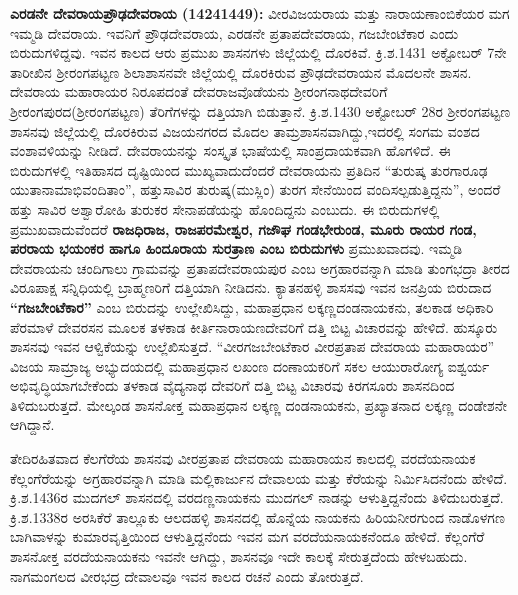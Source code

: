 \textbf{ಎರಡನೇ ದೇವರಾಯ\general{\enginline{-}}ಪ್ರೌಢದೇವರಾಯ (1424\general{\enginline{-}}1449): } ವೀರವಿಜಯರಾಯ ಮತ್ತು ನಾರಾಯಣಾಂಬಿಕೆ\-ಯರ ಮಗ ಇಮ್ಮಡಿ ದೇವರಾಯ. ಇವನಿಗೆ ಪ್ರೌಢದೇವರಾಯ, ಎರಡನೇ ಪ್ರತಾಪದೇವರಾಯ, ಗಜಬೇಂಟೆಕಾರ ಎಂದು ಬಿರುದುಗಳಿದ್ದವು. ಇವನ ಕಾಲದ ಆರು ಪ್ರಮುಖ ಶಾಸನಗಳು ಜಿಲ್ಲೆಯಲ್ಲಿ ದೊರಕಿವೆ. ಕ್ರಿ.ಶ.1431 ಅಕ್ಟೋಬರ್​ 7ನೇ ತಾರೀಖಿನ ಶ‍್ರೀರಂಗಪಟ್ಟಣ ಶಿಲಾಶಾಸನವೇ ಜಿಲ್ಲೆಯಲ್ಲಿ ದೊರಕಿರುವ ಪ್ರೌಢದೇವರಾಯನ ಮೊದಲನೇ ಶಾಸನ. ದೇವರಾಯ ಮಹಾರಾಯರ ನಿರೂಪದಂತೆ ದೇವರಾಜವೊಡೆಯನು ಶ‍್ರೀರಂಗನಾಥದೇವರಿಗೆ ಶ‍್ರೀರಂಗಪುರದ(ಶ‍್ರೀರಂಗಪಟ್ಟಣ) ತೆರಿಗೆಗಳನ್ನು ದತ್ತಿಯಾಗಿ ಬಿಡುತ್ತಾನೆ. ಕ್ರಿ.ಶ.1430 ಅಕ್ಟೋಬರ್​ 28ರ ಶ‍್ರೀರಂಗಪಟ್ಟಣ ಶಾಸನವು ಜಿಲ್ಲೆಯಲ್ಲಿ ದೊರಕಿರುವ ವಿಜಯನಗರದ ಮೊದಲ ತಾಮ್ರಶಾಸನವಾಗಿದ್ದು,ಇದರಲ್ಲಿ ಸಂಗಮ ವಂಶದ ವಂಶಾವಳಿಯನ್ನು ನೀಡಿದೆ. ದೇವರಾಯನನ್ನು ಸಂಸ್ಕೃತ ಭಾಷೆಯಲ್ಲಿ ಸಾಂಪ್ರದಾಯಕವಾಗಿ ಹೊಗಳಿದೆ. ಈ ಬಿರುದುಗಳಲ್ಲಿ ಇತಿಹಾಸದ ದೃಷ್ಟಿಯಿಂದ ಮುಖ್ಯವಾದುದೆಂದರೆ ದೇವರಾಯನು ಪ್ರತಿದಿನ “ತುರುಷ್ಕ ತುರಗಾರೂಢ ಯುತಾನಾಮಾಭಿವಂದಿತಾಂ”, ಹತ್ತುಸಾವಿರ ತುರುಷ್ಕ(ಮುಸ್ಲಿಂ) ತುರಗ ಸೇನೆಯಿಂದ ವಂದಿಸಲ್ಪಡುತ್ತಿದ್ದನು”, ಅಂದರೆ ಹತ್ತು ಸಾವಿರ ಅಶ್ವಾರೋಹಿ ತುರುಕರ ಸೇನಾಪಡೆಯನ್ನು ಹೊಂದಿದ್ದನು ಎಂಬುದು. ಈ ಬಿರುದುಗಳಲ್ಲಿ ಪ್ರಮುಖವಾದುವೆಂದರೆ \textbf{ರಾಜಧಿರಾಜ, ರಾಜಪರಮೇಶ್ವರ, ಗಜೌಘ ಗಂಡಭೇರುಂಡ, ಮೂರು ರಾಯರ ಗಂಡ, ಪರರಾಯ ಭಯಂಕರ ಹಾಗೂ ಹಿಂದೂರಾಯ ಸುರತ್ರಾಣ ಎಂಬ ಬಿರುದುಗಳು} ಪ್ರಮುಖವಾದವು. ಇಮ್ಮಡಿ ದೇವರಾಯನು ಚಂದಿಗಾಲು ಗ್ರಾಮವನ್ನು ಪ್ರತಾಪದೇವರಾಯಪುರ ಎಂಬ ಅಗ್ರಹಾರವನ್ನಾಗಿ ಮಾಡಿ ತುಂಗಭದ್ರಾ ತೀರದ ವಿರೂಪಾಕ್ಷ ಸನ್ನಿಧಿಯಲ್ಲಿ ಬ್ರಾಹ್ಮಣರಿಗೆ ದತ್ತಿಯಾಗಿ ನೀಡಿದನು. ಕ್ಯಾತನಹಳ್ಳಿ ಶಾಸಸವು ಇವನ ಜನಪ್ರಿಯ ಬಿರುದಾದ \textbf{“ಗಜಬೇಂಟೆಕಾರ”} ಎಂಬ ಬಿರುದನ್ನು ಉಲ್ಲೇಖಿಸಿದ್ದು, ಮಹಾಪ್ರಧಾನ ಲಕ್ಕಣ್ಣದಂಡನಾಯಕನು, ತಲಕಾಡ ಅಧಿಕಾರಿ ಪೆರಮಾಳೆ ದೇವರಸನ ಮೂಲಕ ತಳಕಾಡ ಕೀರ್ತಿನಾರಾಯಣದೇವರಿಗೆ ದತ್ತಿ ಬಿಟ್ಟ ವಿಚಾರವನ್ನು ಹೇಳಿದೆ. ಹುಸ್ಕೂರು ಶಾಸನವು ಇವನ ಆಳ್ವಿಕೆಯನ್ನು ಉಲ್ಲೆಖಿಸುತ್ತದೆ. “ವೀರಗಜಬೇಂಟೆಕಾರ ವೀರಪ್ರತಾಪ ದೇವರಾಯ ಮಹಾರಾಯರ” ವಿಜಯ ಸಾಮ್ರಾಜ್ಯ ಅಭ್ಯುದಯದಲ್ಲಿ ಮಹಾಪ್ರಧಾನ ಲಖಂಣ ದಂಣಾಯಕರಿಗೆ ಸಕಲ ಆಯುರಾರೋಗ್ಯ ಐಶ್ವರ್ಯ ಅಭಿವೃದ್ಧಿಯಾಗಬೇಕೆಂದು ತಳಕಾಡ ವೈದ್ಯನಾಥ ದೇವರಿಗೆ ದತ್ತಿ ಬಿಟ್ಟ ವಿಚಾರವು ಕಿರಗಸೂರು ಶಾಸನದಿಂದ ತಿಳಿದುಬರುತ್ತದೆ. ಮೇಲ್ಕಂಡ ಶಾಸನೋಕ್ತ ಮಹಾಪ್ರಧಾನ ಲಕ್ಕಣ್ಣ ದಂಡನಾಯಕನು, ಪ್ರಖ್ಯಾತನಾದ ಲಕ್ಕಣ್ಣ ದಂಡೇಶನೇ ಆಗಿದ್ದಾನೆ.

ತೇದಿರಹಿತವಾದ ಕೆಲಗೆರೆಯ ಶಾಸನವು ವೀರಪ್ರತಾಪ ದೇವರಾಯ ಮಹಾರಾಯನ ಕಾಲದಲ್ಲಿ ವರದೆಯನಾಯಕ ಕೆಲ್ಲಂಗೆರೆಯನ್ನು ಅಗ್ರಹಾರವನ್ನಾಗಿ ಮಾಡಿ ಮಲ್ಲಿಕಾರ್ಜುನ ದೇವಾಲಯ ಮತ್ತು ಕೆರೆಯನ್ನು ನಿರ್ಮಿಸಿದನೆಂದು ಹೇಳಿದೆ. ಕ್ರಿ.ಶ.1436ರ ಮುದಗಲ್​ ಶಾಸನದಲ್ಲಿ ವರದಣ್ಣನಾಯಕನು ಮುದಗಲ್​ ನಾಡನ್ನು ಆಳುತ್ತಿದ್ದನೆಂದು ತಿಳಿದುಬರುತ್ತದೆ. ಕ್ರಿ.ಶ.1338ರ ಅರಸಿಕೆರೆ ತಾಲ್ಲೂಕು ಆಲದಹಳ್ಳಿ ಶಾಸನದಲ್ಲಿ ಹೊನ್ನೆಯ ನಾಯಕನು ಹಿರಿಯನೀರಗುಂದ ನಾಡೊಳಗಣ ಬಾಗಿವಾಳನ್ನು ಕುಮಾರವೃತ್ತಿಯಿಂದ ಆಳುತ್ತಿದ್ದನೆಂದು ಇವನ ಮಗ ವರದೆಯನಾಯಕನೆಂದೂ ಹೇಳಿದೆ. ಕೆಲ್ಲಂಗೆರೆ ಶಾಸನೋಕ್ತ ವರದೆಯನಾಯಕನು ಇವನೇ ಆಗಿದ್ದು, ಶಾಸನವೂ ಇದೇ ಕಾಲಕ್ಕೆ ಸೇರುತ್ತದೆಂದು ಹೇಳಬಹುದು. ನಾಗಮಂಗಲದ ವೀರಭದ್ರ ದೇವಾಲವೂ ಇವನ ಕಾಲದ ರಚನೆ ಎಂದು ತೋರುತ್ತದೆ.

